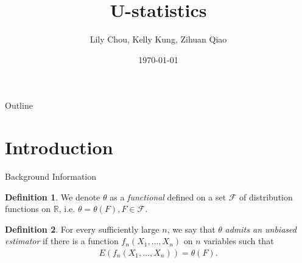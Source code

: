 \documentclass{beamer}
\title{U-statistics}
\author{Lily Chou, Kelly Kung, Zihuan Qiao}
\institute{Probability Theory II}
\date{\today}
\newcommand{\R}{{\mathbb{R}}}
\theoremstyle{definition}
\newtheorem{Def}{Definition}
\numberwithin{Def}{section}
\begin{document}
\begin{frame}
  \titlepage
\end{frame}

\begin{frame}{Outline}
  \tableofcontents
\end{frame}

\section{Introduction}
\begin{frame}{Background Information}
\begin{Def}{}
We denote $\theta$ as a \textit{functional} defined on a set $\mathcal{F}$ of distribution functions on $\R$, i.e. $\theta = \theta(F), F \in \mathcal{F}$.
\end{Def}

\begin{Def}{}
For every sufficiently large $n$, we say that $\theta$ \textit{admits an unbiased estimator} if there is a function $f_n(X_1, \dotsc, X_n)$ on $n$ variables such that \begin{align}\label{unbiased} E(f_n(X_1, \dotsc, X_n)) = \theta(F).\end{align}
\end{Def}
\end{frame}
\end{document}
